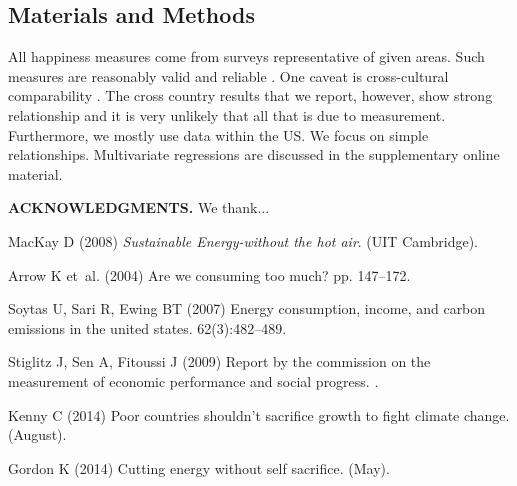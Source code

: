 \documentclass[10pt, letterpaper]{article}
\begin{document}
\begin{spacing}{1.4}


\section*{\large \bf Materials and Methods}
All happiness measures come from surveys representative of given areas. Such measures are reasonably valid and
reliable \cite{diener13b}. %
One caveat is cross-cultural comparability \cite{diener03b}. The cross
country results that we report, however, show  strong relationship and it is very
unlikely that all that is due to measurement. Furthermore, we mostly use data
within the US. %
We focus on simple relationships. Multivariate regressions are
discussed in the supplementary online material. 


\noindent\textbf{ACKNOWLEDGMENTS.} We thank... 


\newpage
%
\begin{thebibliography}{10}

MacKay D (2008) {\em Sustainable Energy-without the hot air}.
\newblock (UIT Cambridge).

Arrow K et~al. (2004) Are we consuming too much?
 pp. 147--172.

Soytas U, Sari R, Ewing BT (2007) Energy consumption, income, and carbon
  emissions in the united states.
 62(3):482--489.

Stiglitz J, Sen A, Fitoussi J (2009) Report by the commission on the
  measurement of economic performance and social progress.
.

Kenny C (2014) Poor countries shouldn't sacrifice growth to fight climate
  change.
 (August).

Gordon K (2014) Cutting energy without self sacrifice.
 (May).


\end{thebibliography}
\end{spacing}
\end{document}
